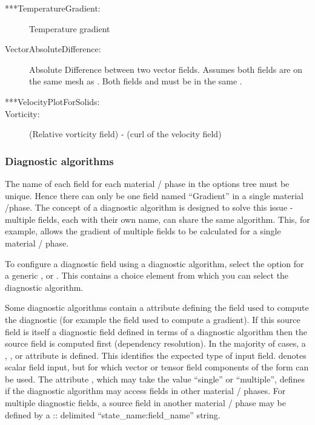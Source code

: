 \begin{description}
 \item[***TemperatureGradient:]Temperature gradient  
 \item[VectorAbsoluteDifference:]Absolute Difference between two vector fields. Assumes both fields are on the same mesh as . Both fields and  must be in the same .    
 \item[***VelocityPlotForSolids:]   
 \item[Vorticity:](Relative vorticity field) - (curl of the velocity field)    
\end{description}


\subsubsection{Diagnostic algorithms}\label{sec:diagnostic_algorithms}

The name of each field for each material / phase  in the options tree must be
unique. Hence there can only be one field named ``Gradient'' in a single
material /phase. The concept of a diagnostic algorithm is designed to solve this
issue - multiple fields, each with their own name, can share the same algorithm.
This, for example, allows the gradient of multiple fields to be calculated for a
single material / phase.

To configure a diagnostic field using a diagnostic algorithm, select the
 option for a generic , 
or . This contains a 
choice element from which you can select the diagnostic algorithm.

Some diagnostic algorithms contain a 
attribute defining the field used to compute the diagnostic (for example the
field used to compute a gradient). If this source field is itself a diagnostic
field defined in terms of a diagnostic algorithm then the source field is
computed first (dependency resolution).
In the majority of cases, a , , 
or  attribute is defined. This identifies the
expected type of input field.  denotes scalar field
input, but for which vector or tensor field components of the form 
can be used.
The attribute , which may take the
value ``single'' or ``multiple'', defines if the diagnostic algorithm may
access fields in other material / phases. For multiple 
diagnostic fields, a source field in another material / phase
may be defined by a :: delimited ``state\_name\::field\_name'' string.


